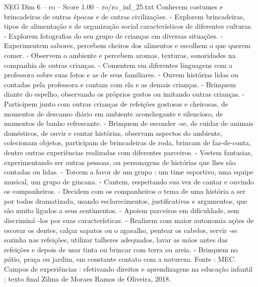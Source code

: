 \begin{textsample}{NEG Dim 6 – ro – Score 1.00 – ro/ro\_inf\_25.txt}
Conhecem costumes e brincadeiras de outras épocas e de outras civilizações. - Explorem brincadeiras, tipos de alimentação e de organização social característicos de diferentes culturas. - Explorem fotografias do seu grupo de crianças em diversas situações. - Experimentem sabores, percebem cheiros dos alimentos e escolhem o que querem comer. - Observem o ambiente e percebem aromas, texturas, sonoridades na companhia de outras crianças. - Comentem em diferentes linguagens com a professora sobre suas fotos e as de seus familiares. - Ouvem histórias lidas ou contadas pela professora e cantam com ela e as demais crianças. - Brinquem diante do espelho, observando os próprios gestos ou imitando outras crianças. - Participem junto com outras crianças de refeições gostosas e cheirosas, de momentos de descanso diário em ambiente aconchegante e silencioso, de momentos de banho refrescante. - Brinquem de esconder -se, de cuidar de animais domésticos, de ouvir e contar histórias, observam aspectos do ambiente, colecionam objetos, participam de brincadeiras de roda, brincam de faz-de-conta, dentre outras experiências realizadas com diferentes parceiros. - Vestem fantasias, experimentando ser outras pessoas, ou personagens de histórias que lhes são contadas ou lidas. - Torcem a favor de um grupo : um time esportivo, uma equipe musical, um grupo de gincana. - Cantem, respeitando sua vez de cantar e ouvindo os companheiros. - Decidem com os companheiros o tema de uma história a ser por todos dramatizada, usando esclarecimentos, justificativas e argumentos, que são muito ligados a seus sentimentos. - Apoiem parceiros em dificuldade, sem discriminá -los por suas características. - Realizem com maior autonomia ações de escovar os dentes, calçar sapatos ou o agasalho, pentear os cabelos, servir -se sozinha nas refeições, utilizar talheres adequados, lavar as mãos antes das refeições e depois de usar tinta ou brincar com terra ou areia. - Brinquem no pátio, praça ou jardim, em constante contato com a natureza.
Fonte : MEC.
Campos de experiências : efetivando direitos e aprendizagens na educação infantil ; texto final Zilma de Moraes Ramos de Oliveira, 2018.

\end{textsample}
